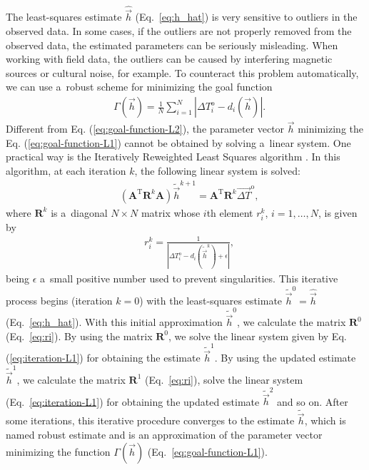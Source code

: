 \documentclass[journal abbreviation, npg]{copernicus}
\begin{document}
The least-squares estimate $\hat{\vec{h}}$ (Eq.~\ref{eq:h_hat}) is very
sensitive to outliers in the observed data. In some cases, if the outliers
are not properly removed from the observed data, the estimated parameters can
be seriously misleading. When working with field data, the outliers can be
caused by interfering magnetic sources or cultural noise, for example. To
counteract this problem automatically, we can use a~robust scheme for
minimizing the goal function
\begin{align}
 &
\Gamma(\vec{h}) = \frac{1}{N} \sum_{i = 1}^{N}
\left\vert \Delta T^\mathrm{o}_{i} - d_{i}(\vec{h}) \right\vert .
\label{eq:goal-function-L1}
\end{align}
Different from Eq. (\ref{eq:goal-function-L2}), the parameter vector
$\vec{h}$ minimizing the Eq. (\ref{eq:goal-function-L1}) cannot be
obtained by solving a~linear system. One practical way is the
Iteratively Reweighted Least Squares algorithm \citep{scales_1988,aster-etal2005}. In this algorithm, at each iteration $k$, the
following linear system is solved:
\begin{align}
 &
(\mathbf{A}^{\mathrm{T}} \mathbf{R}^{k} \mathbf{A} ) \tilde{\vec{h}}^{k+1} =
\mathbf{A}^{\mathrm{T}} \mathbf{R}^{k} \vec{\Delta T}^\mathrm{o} ,
\label{eq:iteration-L1}
\end{align}
where $\mathbf{R}^{k}$ is a~diagonal $N \times N$ matrix whose $i$th
element $r_{i}^{k}$, $i = 1, \ldots, N$, is given by
\begin{align}
 &
r_{i}^{k} = \frac{1}{\left\vert \Delta T^\mathrm{o}_{i} - d_{i}\left(\tilde{\vec{h}}^{k}\right) + \epsilon \right\vert} ,
\label{eq:ri}
\end{align}
being $\epsilon$ a~small positive number used to prevent singularities. This
iterative process begins (iteration $k = 0$) with the least-squares estimate
$\tilde{\vec{h}}^{0} = \hat{\vec{h}}$ (Eq.~\ref{eq:h_hat}). With this initial
approximation $\tilde{\vec{h}}^{0}$, we calculate the matrix $\mathbf{R}^{0}$
(Eq.~\ref{eq:ri}). By using the matrix $\mathbf{R}^{0}$, we solve the linear
system given by Eq. (\ref{eq:iteration-L1}) for obtaining the estimate
$\tilde{\vec{h}}^{1}$. By using the updated estimate $\tilde{\vec{h}}^{1}$,
we calculate the matrix $\mathbf{R}^{1}$ (Eq.~\ref{eq:ri}), solve the linear
system (Eq.~\ref{eq:iteration-L1}) for obtaining the updated estimate
$\tilde{\vec{h}}^{2}$ and so on. After some iterations, this iterative
procedure converges to the estimate $\tilde{\vec{h}}$, which is named robust
estimate and is an approximation of the parameter vector minimizing the
function $\Gamma(\vec{h})$ (Eq.~\ref{eq:goal-function-L1}).
\end{document}
